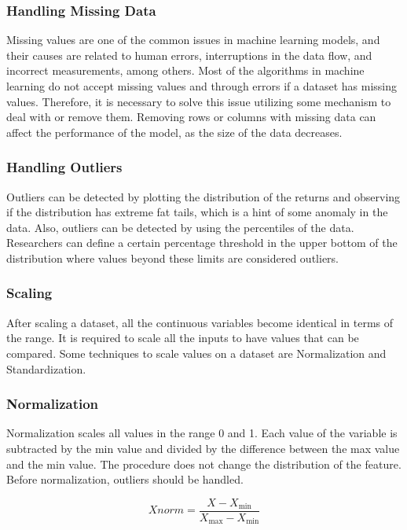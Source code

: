 \documentclass[conference]{IEEEtran}
\begin{document}
\subsubsection{Handling Missing Data}
Missing values are one of the common issues in machine learning models, and their causes are related to human errors, interruptions in the data flow, and incorrect measurements, among others.
Most of the algorithms in machine learning do not accept missing values and through errors if a dataset has missing values.
Therefore, it is necessary to solve this issue utilizing some mechanism to deal with or remove them.
Removing rows or columns with missing data can affect the performance of the model, as the size of the data decreases.

\subsubsection{Handling Outliers}
Outliers can be detected by plotting the distribution of the returns and observing if the distribution has extreme fat tails, which is a hint of some anomaly in the data.
Also, outliers can be detected by using the percentiles of the data.
Researchers can define a certain percentage threshold in the upper bottom of the distribution where values beyond these limits are considered outliers.

\subsubsection{Scaling}
After scaling a dataset, all the continuous variables become identical in terms of the range.
It is required to scale all the inputs to have values that can be compared.
Some techniques to scale values on a dataset are Normalization and Standardization.

\subsubsection{Normalization}
Normalization scales all values in the range 0 and 1.
Each value of the variable is subtracted by the min value and divided by the difference between the max value and the min value.
The procedure does not change the distribution of the feature.
Before normalization, outliers should be handled.

\begin{equation}
    Xnorm = \frac{X - X_{\min}}{X_{\max} - X_{\min}}
\end{equation}
\end{document}
